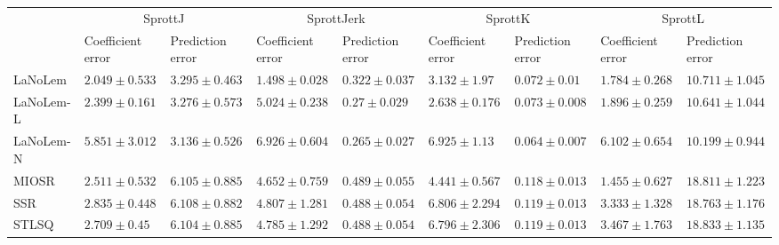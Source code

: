 \begin{table*}
{\begin{tabular}{lllllllll}
 & \multicolumn{2}{c}{SprottJ} & \multicolumn{2}{c}{SprottJerk} & \multicolumn{2}{c}{SprottK} & \multicolumn{2}{c}{SprottL} \\
 & Coefficient error & Prediction error & Coefficient error & Prediction error & Coefficient error & Prediction error & Coefficient error & Prediction error \\
\midrule
LaNoLem & $\mathbf{2.049}\pm 0.533$ & $3.295\pm 0.463$ & $\mathbf{1.498}\pm 0.028$ & $0.322\pm 0.037$ & $3.132\pm 1.97$ & $0.072\pm 0.01$ & $1.784\pm 0.268$ & $10.711\pm 1.045$ \\
LaNoLem-L & $2.399\pm 0.161$ & $3.276\pm 0.573$ & $5.024\pm 0.238$ & $0.27\pm 0.029$ & $\mathbf{2.638}\pm 0.176$ & $0.073\pm 0.008$ & $1.896\pm 0.259$ & $10.641\pm 1.044$ \\
LaNoLem-N & $5.851\pm 3.012$ & $\mathbf{3.136}\pm 0.526$ & $6.926\pm 0.604$ & $\mathbf{0.265}\pm 0.027$ & $6.925\pm 1.13$ & $\mathbf{0.064}\pm 0.007$ & $6.102\pm 0.654$ & $\mathbf{10.199}\pm 0.944$ \\
MIOSR & $2.511\pm 0.532$ & $6.105\pm 0.885$ & $4.652\pm 0.759$ & $0.489\pm 0.055$ & $4.441\pm 0.567$ & $0.118\pm 0.013$ & $\mathbf{1.455}\pm 0.627$ & $18.811\pm 1.223$ \\
SSR & $2.835\pm 0.448$ & $6.108\pm 0.882$ & $4.807\pm 1.281$ & $0.488\pm 0.054$ & $6.806\pm 2.294$ & $0.119\pm 0.013$ & $3.333\pm 1.328$ & $18.763\pm 1.176$ \\
STLSQ & $2.709\pm 0.45$ & $6.104\pm 0.885$ & $4.785\pm 1.292$ & $0.488\pm 0.054$ & $6.796\pm 2.306$ & $0.119\pm 0.013$ & $3.467\pm 1.763$ & $18.833\pm 1.135$ \\

\midrule


\end{tabular}}
\end{table*}
